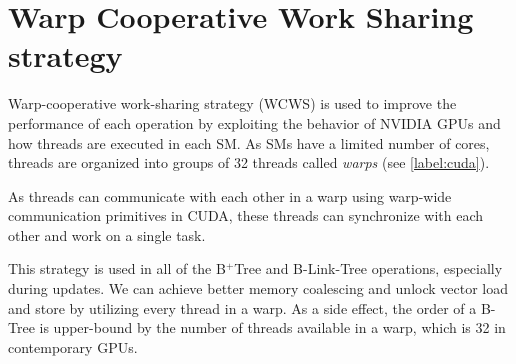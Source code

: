 \section{Warp Cooperative Work Sharing strategy}

Warp-cooperative work-sharing strategy (WCWS) is used to improve the performance of each operation by exploiting the behavior of NVIDIA GPUs and how threads are executed in each SM. As SMs have a limited number of cores, threads are organized into groups of 32 threads called \textit{warps} (see \cref{label:cuda}).


As threads can communicate with each other in a warp using warp-wide communication primitives in CUDA, these threads can synchronize with each other and work on a single task.

This strategy is used in all of the B$^+$Tree and B-Link-Tree operations, especially during updates. We can achieve better memory coalescing and unlock vector load and store by utilizing every thread in a warp. As a side effect, the order of a B-Tree is upper-bound by the number of threads available in a warp, which is 32 in contemporary GPUs.
